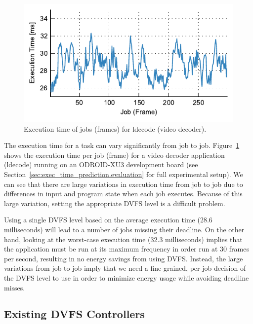 \begin{figure}
  \begin{center}
    \includegraphics{exec_time_prediction/figs/ldecode_time.pdf}
    \caption{Execution time of jobs (frames) for ldecode (video decoder).}
    \label{fig:exec_time_prediction.applications.ldecode_time}
  \end{center}
\end{figure}

The execution time for a task can vary significantly from job to job.
Figure~\ref{fig:exec_time_prediction.applications.ldecode_time} shows the
execution time per job (frame) for a video decoder application (ldecode)
running on an ODROID-XU3 development board (see
Section~\ref{sec:exec_time_prediction.evaluation} for full experimental setup).
We can see that there are large variations in execution time from job to job
due to differences in input and program state when each job executes. Because
of this large variation, setting the appropriate DVFS level is a difficult
problem. 

Using a single DVFS level based on the average execution time (28.6
milliseconds) will lead to a number of jobs missing their deadline. On the
other hand, looking at the worst-case execution time (32.3 milliseconds)
implies that the application must be run at its maximum frequency in order run
at 30 frames per second, resulting in no energy savings from using DVFS.
Instead, the large variations
from job to job imply that we need a fine-grained, per-job decision of the DVFS
level to use in order to minimize energy usage while avoiding deadline misses.

\subsection{Existing DVFS Controllers}
\label{sec:exec_time_prediction.applications.existing}

